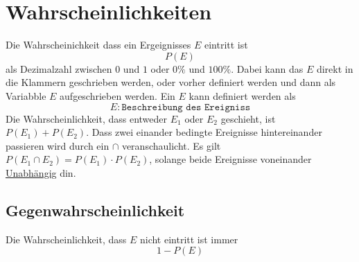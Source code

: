 \documentclass{article}
\begin{document}
 
\section{Wahrscheinlichkeiten} 
Die Wahrscheinichkeit dass ein Ergeignisses $E$ eintritt ist
\[
 P(E) 
\]
als Dezimalzahl zwischen $0$ und $1$ oder $0\%$ und $100\%$. Dabei kann das $E$ direkt in die Klammern geschrieben werden, oder vorher definiert werden und dann als Variabble $E$ aufgeschrieben werden. Ein $E$ kann definiert werden als
\[
 E : \texttt{Beschreibung des Ereigniss} 
\]
Die Wahrscheinlichkeit, dass entweder $E_1$ oder $E_2$ geschieht, ist $P(E_1) + P(E_2)$. Dass zwei einander bedingte Ereignisse hintereinander passieren wird durch ein $\cap$ veranschaulicht. Es gilt $P(E_1 \cap E_2) = P(E_1) \cdot P(E_2)$, solange beide Ereignisse voneinander \hyperref[Unabhängigkeiten]{Unabhängig} din.
 
\subsection{Gegenwahrscheinlichkeit}
Die Wahrscheinlichkeit, dass $E$ nicht eintritt ist immer
\[
 1 - P(E) 
\] 
 
\end{document}
